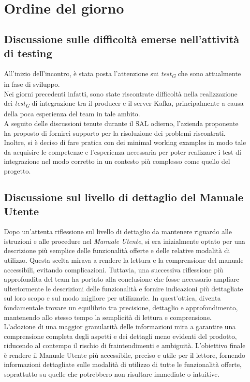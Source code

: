 \documentclass{article}
\begin{document}
\section{Ordine del giorno}
    \subsection{Discussione sulle difficoltà emerse nell'attività di testing}
    All'inizio dell'incontro, è stata posta l'attenzione sui \textit{test}\textsubscript{\textit{G}} che sono attualmente in fase di sviluppo. \\
    Nei giorni precedenti infatti, sono state riscontrate difficoltà nella realizzazione dei \textit{test}\textsubscript{\textit{G}} di integrazione tra il producer e il server Kafka, principalmente a causa della poca esperienza del team in tale ambito. \\
    A seguito delle discussioni tenute durante il SAL odierno, l'azienda proponente ha proposto di fornirci supporto per la risoluzione dei problemi riscontrati. Inoltre, si è deciso di fare pratica con dei minimal working examples in modo tale da acquisire le competenze e l'esperienza necessaria per poter realizzare i test di integrazione nel modo corretto in un contesto più complesso come quello del progetto.

    \subsection{Discussione sul livello di dettaglio del Manuale Utente}
    Dopo un'attenta riflessione sul livello di dettaglio da mantenere riguardo alle istruzioni e alle procedure nel \textit{Manuale Utente}, si era inizialmente optato per una descrizione più semplice delle funzionalità offerte e delle relative modalità di utilizzo. Questa scelta mirava a rendere la lettura e la comprensione del manuale accessibili, evitando complicazioni. Tuttavia, una successiva riflessione più approfondita del team ha portato alla conclusione che fosse necessario ampliare ulteriormente le descrizioni delle funzionalità e fornire indicazioni più dettagliate sul loro scopo e sul modo migliore per utilizzarle. In quest'ottica, diventa fondamentale trovare un equilibrio tra precisione, dettaglio e approfondimento, mantenendo allo stesso tempo la semplicità di lettura e comprensione. \\
    L'adozione di una maggior granularità delle informazioni mira a garantire una comprensione completa degli aspetti e dei dettagli meno evidenti del prodotto, riducendo al contempo il rischio di fraintendimenti e ambiguità. L'obiettivo finale è rendere il Manuale Utente più accessibile, preciso e utile per il lettore, fornendo informazioni dettagliate sulle modalità di utilizzo di tutte le funzionalità offerte, soprattutto su quelle che potrebbero non risultare immediate o intuitive.
\end{document}
